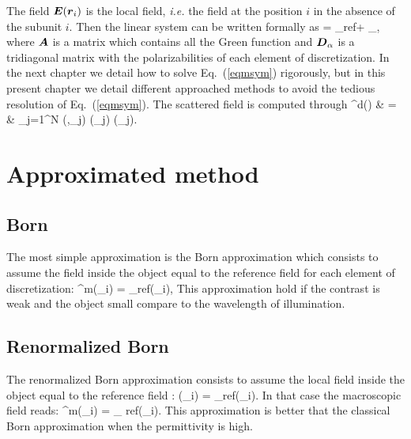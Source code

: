 The field $\boldsymbol{E}(\boldsymbol{r}_i)$ is the local field, {\it i.e.}  the field
at the position $i$ in the absence of the subunit $i$. Then the linear
system can be written formally as
\be {} =  _{\rm ref}+  _\alpha {}, \label{eqmsym}\ee
where $\boldsymbol{A}$ is a matrix which contains all the Green function and
$\boldsymbol{D}_\alpha$ is a tridiagonal matrix with the polarizabilities of
each element of discretization. In the next chapter we detail how to
solve Eq.~(\ref{eqmsym}) rigorously, but in this present chapter we
detail different approached methods to avoid the tedious resolution of
Eq.~(\ref{eqmsym}).  The scattered field is computed through
\be{}^{\rm d}() & = & \sum_{j=1}^N (,_j)
\alpha(_j) (_j). \ee



\section{Approximated method}


\subsection{Born}


The most simple approximation is the Born approximation which consists
to assume the field inside the object equal to the reference field for
each element of discretization:
\be {}^{\rm m}(_i) = _{\rm ref}(_i), \ee
This approximation hold if the contrast is weak and the object small
compare to the wavelength of illumination.


\subsection{Renormalized Born }

The renormalized Born approximation consists to assume the local field
inside the object equal to the reference field :
\be {}(_i) = _{\rm ref}(_i). \ee
In that case the macroscopic field reads:
\be {}^{\rm m}(_i) =  _{\rm
    ref}(_i). \ee
This approximation is better that the classical Born approximation
when the permittivity is high.


